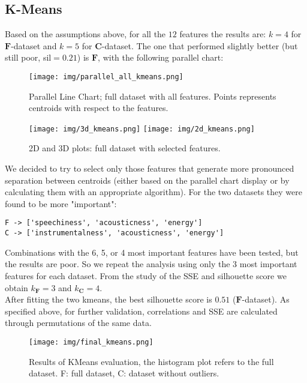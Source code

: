 \subsection{K-Means}
Based on the assumptions above, for all the $12$ features the results are: $k=4$ for $\mathbf{F}$-dataset and $k=5$ for $\mathbf{C}$-dataset. The one that performed slightly better (but still poor, sil$=0.21$) is $\mathbf{F}$, with the following parallel chart:
\begin{figure}[H]
    \centering
    \texttt{[image: img/parallel\_all\_kmeans.png]}
    \caption{Parallel Line Chart; full dataset with all features. Points represents centroids with respect to the features.}
    \label{fig:parallel}
\end{figure}
\begin{wrapfigure}{r}{0.35\textwidth}
\vspace{-1cm}
\caption{2D and 3D plots: full dataset with selected features.}
\texttt{[image: img/3d\_kmeans.png]}
\vspace{2cm}
\texttt{[image: img/2d\_kmeans.png]}
\vspace{-5cm}
\end{wrapfigure}
We decided to try to select only those features that generate more pronounced separation between centroids (either based on the parallel chart display or by calculating them with an appropriate algorithm). For the two datasets they were found to be more "important":
\begin{verbatim}
F -> ['speechiness', 'acousticness', 'energy']
C -> ['instrumentalness', 'acousticness', 'energy']
\end{verbatim}
Combinations with the 6, 5, or 4 most important features have been tested, but the results are poor. So we repeat the analysis using only the 3 most important features for each dataset. From the study of the SSE and silhouette score we obtain $k_\mathbf{F}=3$ and $k_\mathbf{C}=4$. \\
After fitting the two kmeans, the best silhouette score is $0.51$ ($\mathbf{F}$-dataset). As specified above, for further validation, correlations and SSE are calculated through permutations of the same data.
\begin{figure}[H]
\vspace{0.5cm}
    \centering
    \texttt{[image: img/final\_kmeans.png]}
    \caption{Results of KMeans evaluation, the histogram plot refers to the full dataset. F: full dataset, C: dataset without outliers.}
    \label{fig:enter-label}
\end{figure}
